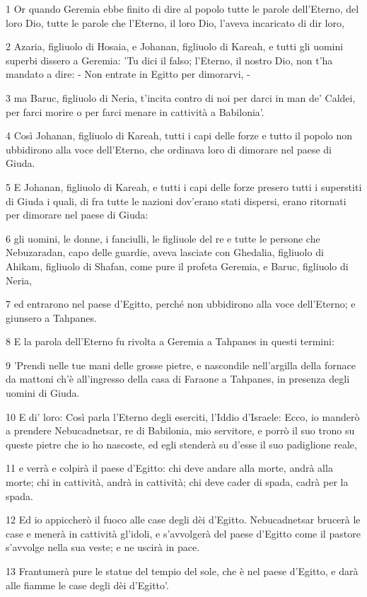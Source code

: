 \par 1 Or quando Geremia ebbe finito di dire al popolo tutte le parole dell'Eterno, del loro Dio, tutte le parole che l'Eterno, il loro Dio, l'aveva incaricato di dir loro,
\par 2 Azaria, figliuolo di Hosaia, e Johanan, figliuolo di Kareah, e tutti gli uomini superbi dissero a Geremia: 'Tu dici il falso; l'Eterno, il nostro Dio, non t'ha mandato a dire: - Non entrate in Egitto per dimorarvi, -
\par 3 ma Baruc, figliuolo di Neria, t'incita contro di noi per darci in man de' Caldei, per farci morire o per farci menare in cattività a Babilonia'.
\par 4 Così Johanan, figliuolo di Kareah, tutti i capi delle forze e tutto il popolo non ubbidirono alla voce dell'Eterno, che ordinava loro di dimorare nel paese di Giuda.
\par 5 E Johanan, figliuolo di Kareah, e tutti i capi delle forze presero tutti i superstiti di Giuda i quali, di fra tutte le nazioni dov'erano stati dispersi, erano ritornati per dimorare nel paese di Giuda:
\par 6 gli uomini, le donne, i fanciulli, le figliuole del re e tutte le persone che Nebuzaradan, capo delle guardie, aveva lasciate con Ghedalia, figliuolo di Ahikam, figliuolo di Shafan, come pure il profeta Geremia, e Baruc, figliuolo di Neria,
\par 7 ed entrarono nel paese d'Egitto, perché non ubbidirono alla voce dell'Eterno; e giunsero a Tahpanes.
\par 8 E la parola dell'Eterno fu rivolta a Geremia a Tahpanes in questi termini:
\par 9 'Prendi nelle tue mani delle grosse pietre, e nascondile nell'argilla della fornace da mattoni ch'è all'ingresso della casa di Faraone a Tahpanes, in presenza degli uomini di Giuda.
\par 10 E di' loro: Così parla l'Eterno degli eserciti, l'Iddio d'Israele: Ecco, io manderò a prendere Nebucadnetsar, re di Babilonia, mio servitore, e porrò il suo trono su queste pietre che io ho nascoste, ed egli stenderà su d'esse il suo padiglione reale,
\par 11 e verrà e colpirà il paese d'Egitto: chi deve andare alla morte, andrà alla morte; chi in cattività, andrà in cattività; chi deve cader di spada, cadrà per la spada.
\par 12 Ed io appiccherò il fuoco alle case degli dèi d'Egitto. Nebucadnetsar brucerà le case e menerà in cattività gl'idoli, e s'avvolgerà del paese d'Egitto come il pastore s'avvolge nella sua veste; e ne uscirà in pace.
\par 13 Frantumerà pure le statue del tempio del sole, che è nel paese d'Egitto, e darà alle fiamme le case degli dèi d'Egitto'.

